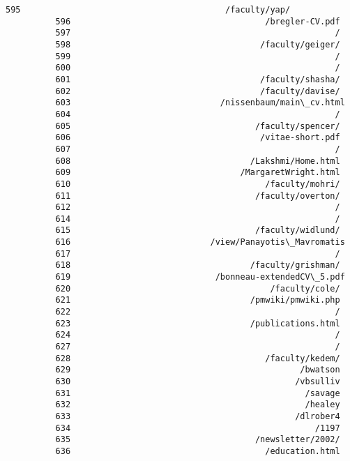 \documentclass[11pt]{article}
\begin{document}
\begin{Verbatim}[commandchars=\\\{\}]
          595                                         /faculty/yap/
          596                                       /bregler-CV.pdf
          597                                                     /
          598                                      /faculty/geiger/
          599                                                     /
          600                                                     /
          601                                      /faculty/shasha/
          602                                      /faculty/davise/
          603                              /nissenbaum/main\_cv.html
          604                                                     /
          605                                     /faculty/spencer/
          606                                      /vitae-short.pdf
          607                                                     /
          608                                    /Lakshmi/Home.html
          609                                  /MargaretWright.html
          610                                       /faculty/mohri/
          611                                     /faculty/overton/
          612                                                     /
          614                                                     /
          615                                     /faculty/widlund/
          616                            /view/Panayotis\_Mavromatis
          617                                                     /
          618                                    /faculty/grishman/
          619                             /bonneau-extendedCV\_5.pdf
          620                                        /faculty/cole/
          621                                    /pmwiki/pmwiki.php
          622                                                     /
          623                                    /publications.html
          624                                                     /
          627                                                     /
          628                                       /faculty/kedem/
          629                                              /bwatson
          630                                             /vbsulliv
          631                                               /savage
          632                                               /healey
          633                                             /dlrober4
          634                                                 /1197
          635                                     /newsletter/2002/
          636                                       /education.html

\end{Verbatim}
\end{document}
